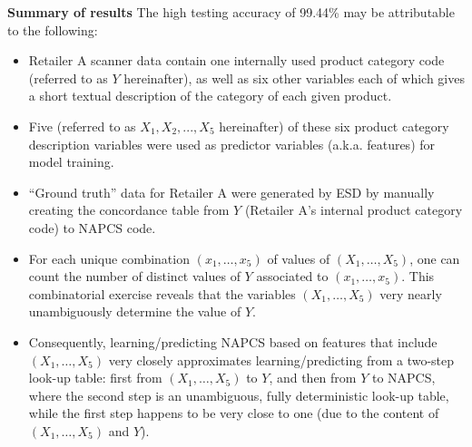 \begin{center}
\begin{minipage}{5.5in}
	\vskip 0.5cm
	\textbf{Summary of results}
	\vskip 0.2cm
	The high testing accuracy of 99.44\% may be attributable to the following:
	\begin{itemize}
	\item
		Retailer A scanner data contain one internally used product category code
		(referred to as $Y$ hereinafter), as well as six other variables each of which
		gives a short textual description of the category of each given product.
	\item
		Five (referred to as $X_{1}, X_{2}, ... , X_{5}$ hereinafter) of these six
		product category description variables were used as predictor variables
		(a.k.a. features) for model training. 
	\item
		``Ground truth'' data for Retailer A were generated by ESD by manually
		creating the concordance table from $Y$ (Retailer A's internal product
		category code) to NAPCS code.
	\item
		For each unique combination $(x_{1}, \ldots, x_{5})$ of values of
		$(X_{1}, \ldots, X_{5})$, one can count the number of distinct values of
		$Y$ associated to $(x_{1}, \ldots, x_{5})$.
		This combinatorial exercise reveals that the variables
		$(X_{1}, \ldots, X_{5})$ very nearly unambiguously determine the value of $Y$.
	\item
		Consequently, learning/predicting NAPCS based on features that include
		$(X_{1}, \ldots, X_{5})$ very closely approximates learning/predicting from
		a two-step look-up table: first from $(X_{1}, \ldots, X_{5})$ to $Y$, and
		then from $Y$ to NAPCS, where the second step is an unambiguous, fully
		deterministic look-up table, while the first step happens to be very close
		to one (due to the content of $(X_{1}, \ldots, X_{5})$ and $Y$). 
	\end{itemize}

\end{minipage}
\end{center}



